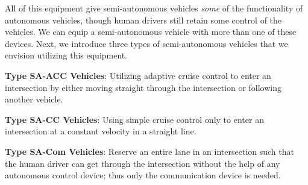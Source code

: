 All of this equipment give semi-autonomous vehicles \emph{some} of
the functionality of autonomous vehicles, though human drivers still
retain some control of the vehicles.  We can equip a semi-autonomous
vehicle with more than one of these devices.  Next, we introduce three
types of semi-autonomous vehicles that we envision utilizing this
equipment.

\begin{small_ind_s_itemize}
\item \textbf{Type SA-ACC Vehicles}: Utilizing adaptive cruise
control to enter an intersection by either moving straight through the
intersection or following another vehicle.
\item \textbf{Type SA-CC Vehicles}: Using simple cruise control only
to enter an intersection at a constant velocity in a straight line.
\item \textbf{Type SA-Com Vehicles}: Reserve an entire lane in an
intersection such that the human driver can get through the
intersection without the help of any autonomous control device; thus
only the communication device is needed.
\end{small_ind_s_itemize}

